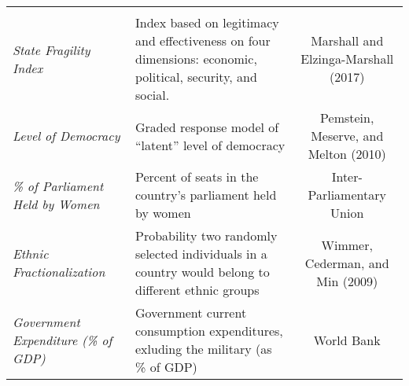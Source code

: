 \documentclass[11pt,]{article}
\begin{document}
\begin{longtable}[]{@{}llc@{}}
\begin{minipage}[t]{0.22\columnwidth}
\end{minipage}\tabularnewline
\begin{minipage}[t]{0.19\columnwidth}\raggedright\strut
\emph{State Fragility Index}\strut
\end{minipage} & \begin{minipage}[t]{0.46\columnwidth}\raggedright\strut
Index based on legitimacy and effectiveness on four dimensions:
economic, political, security, and social.\strut
\end{minipage} & \begin{minipage}[t]{0.22\columnwidth}\centering\strut
Marshall and Elzinga-Marshall (2017)\strut
\end{minipage}\tabularnewline
\begin{minipage}[t]{0.19\columnwidth}\raggedright\strut
\emph{Level of Democracy}\strut
\end{minipage} & \begin{minipage}[t]{0.46\columnwidth}\raggedright\strut
Graded response model of ``latent'' level of democracy\strut
\end{minipage} & \begin{minipage}[t]{0.22\columnwidth}\centering\strut
Pemstein, Meserve, and Melton (2010)\strut
\end{minipage}\tabularnewline
\begin{minipage}[t]{0.19\columnwidth}\raggedright\strut
\emph{\% of Parliament Held by Women}\strut
\end{minipage} & \begin{minipage}[t]{0.46\columnwidth}\raggedright\strut
Percent of seats in the country's parliament held by women\strut
\end{minipage} & \begin{minipage}[t]{0.22\columnwidth}\centering\strut
Inter-Parliamentary Union\strut
\end{minipage}\tabularnewline
\begin{minipage}[t]{0.19\columnwidth}\raggedright\strut
\emph{Ethnic Fractionalization}\strut
\end{minipage} & \begin{minipage}[t]{0.46\columnwidth}\raggedright\strut
Probability two randomly selected individuals in a country would belong
to different ethnic groups\strut
\end{minipage} & \begin{minipage}[t]{0.22\columnwidth}\centering\strut
Wimmer, Cederman, and Min (2009)\strut
\end{minipage}\tabularnewline
\begin{minipage}[t]{0.19\columnwidth}\raggedright\strut
\emph{Government Expenditure (\% of GDP)}\strut
\end{minipage} & \begin{minipage}[t]{0.46\columnwidth}\raggedright\strut
Government current consumption expenditures, exluding the military (as
\% of GDP)\strut
\end{minipage} & \begin{minipage}[t]{0.22\columnwidth}\centering\strut
World Bank\strut
\end{minipage}\tabularnewline
\bottomrule
\end{longtable}
\end{document}
